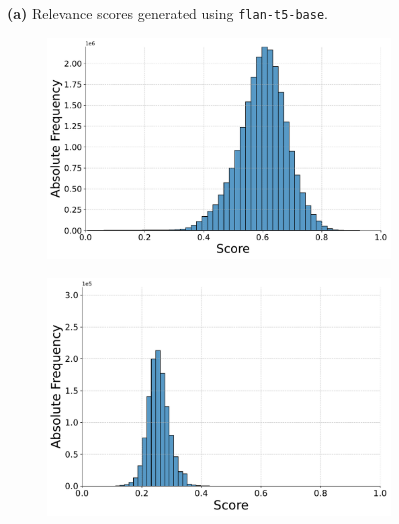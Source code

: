 \begin{figure}[ht!]
    \vspace{-0.5cm}
    \textbf{(a)} Relevance scores generated using \texttt{flan-t5-base}.
    \vspace{0.5cm}

    \begin{subfigure}[b]{0.49\textwidth}
        \centering
        \includegraphics[width=\textwidth]{graphics/evaluation/pairwise_score_distribution_flan-t5-small.pdf}
        \label{fig:pairwise_flan-t5-small}
    \end{subfigure}
    \hfill
    \begin{subfigure}[b]{0.49\textwidth}
        \centering
        \includegraphics[width=\textwidth]{graphics/evaluation/pointwise_score_distribution_flan-t5-small.pdf}
        \label{fig:pointwise_flan-t5-small}
    \end{subfigure}


\end{figure}
